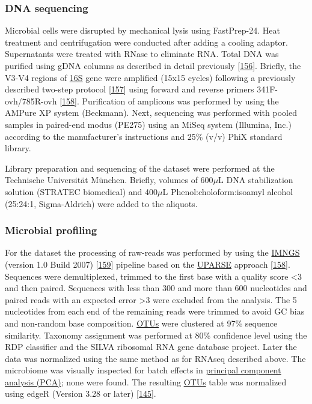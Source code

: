 \documentclass[
  12pt,
  a4paper,
  twoside,
  openright]{book}
\begin{document}
\hypertarget{dna-sequencing}{%
\subsubsection{DNA sequencing}\label{dna-sequencing}}

Microbial cells were disrupted by mechanical lysis using FastPrep-24.
Heat treatment and centrifugation were conducted after adding a cooling adaptor.
Supernatants were treated with RNase to eliminate RNA.
Total DNA was purified using gDNA columns as described in detail previously {[}\protect\hyperlink{ref-berry2011}{156}{]}.
Briefly, the V3-V4 regions of \protect\hyperlink{acronyms_16S}{16S} gene were amplified (15x15 cycles) following a previously described two-step protocol {[}\protect\hyperlink{ref-klindworth2013}{157}{]} using forward and reverse primers 341F-ovh/785R-ovh {[}\protect\hyperlink{ref-edgar2013}{158}{]}.
Purification of amplicons was performed by using the AMPure XP system (Beckmann).
Next, sequencing was performed with pooled samples in paired-end modus (PE275) using an MiSeq system (Illumina, Inc.) according to the manufacturer's instructions and 25\% (v/v) PhiX standard library.

Library preparation and sequencing of the dataset were performed at the Technische Universität München.
Briefly, volumes of 600\(\mu\)L DNA stabilization solution (STRATEC biomedical) and 400\(\mu\)L Phenol:choloform:isoamyl alcohol (25:24:1, Sigma-Aldrich) were added to the aliquots.

\hypertarget{microbial-profiling}{%
\subsubsection{Microbial profiling}\label{microbial-profiling}}

For the dataset the processing of raw-reads was performed by using the \href{https://www.imngs.org/}{IMNGS} (version 1.0 Build 2007) {[}\protect\hyperlink{ref-lagkouvardos2016}{159}{]} pipeline based on the \href{https://www.drive5.com/uparse/}{UPARSE} approach {[}\protect\hyperlink{ref-edgar2013}{158}{]}.
Sequences were demultiplexed, trimmed to the first base with a quality score \textless3 and then paired.
Sequences with less than 300 and more than 600 nucleotides and paired reads with an expected error \textgreater3 were excluded from the analysis.
The 5 nucleotides from each end of the remaining reads were trimmed to avoid GC bias and non-random base composition.
\protect\hyperlink{acronyms_OTUs}{OTUs} were clustered at 97\% sequence similarity.
Taxonomy assignment was performed at 80\% confidence level using the RDP classifier and the SILVA ribosomal RNA gene database project.
Later the data was normalized using the same method as for RNAseq described above.
The microbiome was visually inspected for batch effects in \protect\hyperlink{acronyms_PCA}{principal component analysis (PCA)}; none were found.
The resulting \protect\hyperlink{acronyms_OTUs}{OTUs} table was normalized using edgeR (Version 3.28 or later) {[}\protect\hyperlink{ref-mccarthy2012}{145}{]}.
\end{document}
